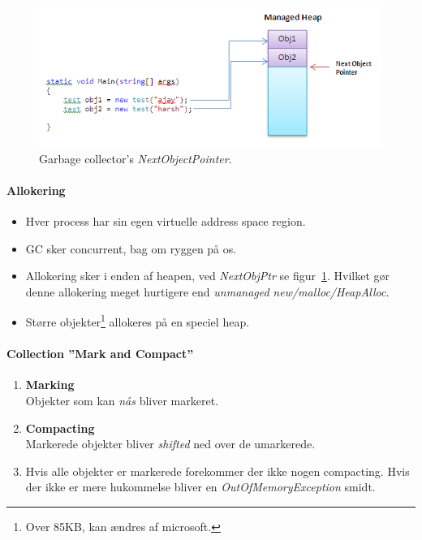 \begin{figure}[h]
	\centering
	\includegraphics[width=\linewidth]{figs/nextobjptr}
	\caption{Garbage collector's \textit{NextObjectPointer}.}
	\label{fig:nextobjptr}
\end{figure}

\paragraph{Allokering}
\begin{itemize}
	\item Hver process har sin egen virtuelle address space region.
	\item GC sker concurrent, bag om ryggen på os.
	\item Allokering sker i enden af heapen, ved \textit{NextObjPtr} se figur~\ref{fig:nextobjptr}. Hvilket gør denne allokering meget hurtigere end \textit{unmanaged} \textit{new/malloc/HeapAlloc}.
	\item Større objekter\footnote{Over 85KB, kan ændres af microsoft.} allokeres på en speciel heap.
\end{itemize}

\paragraph{Collection ''Mark and Compact''}
\begin{enumerate}
	\item \textbf{Marking}\\
	Objekter som kan \textit{nås} bliver markeret.
	\item \textbf{Compacting}\\
	Markerede objekter bliver \textit{shifted} ned over de umarkerede.
	\item Hvis alle objekter er markerede forekommer der ikke nogen compacting. Hvis der ikke er mere hukommelse bliver en \textit{OutOfMemoryException} smidt.
\end{enumerate}

